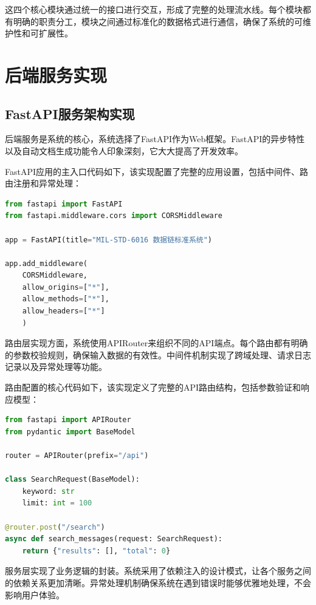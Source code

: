 这四个核心模块通过统一的接口进行交互，形成了完整的处理流水线。每个模块都有明确的职责分工，模块之间通过标准化的数据格式进行通信，确保了系统的可维护性和可扩展性。





\section{后端服务实现}

\subsection{FastAPI服务架构实现}

后端服务是系统的核心，系统选择了FastAPI作为Web框架。FastAPI的异步特性以及自动文档生成功能令人印象深刻，它大大提高了开发效率。

FastAPI应用的主入口代码如下，该实现配置了完整的应用设置，包括中间件、路由注册和异常处理：

\begin{lstlisting}[language=Python, label=fig:fastapi_main]
from fastapi import FastAPI
from fastapi.middleware.cors import CORSMiddleware

app = FastAPI(title="MIL-STD-6016 数据链标准系统")

app.add_middleware(
    CORSMiddleware,
    allow_origins=["*"],
    allow_methods=["*"],
    allow_headers=["*"]
    )
\end{lstlisting}

路由层实现方面，系统使用APIRouter来组织不同的API端点。每个路由都有明确的参数校验规则，确保输入数据的有效性。中间件机制实现了跨域处理、请求日志记录以及异常处理等功能。

路由配置的核心代码如下，该实现定义了完整的API路由结构，包括参数验证和响应模型：

\begin{lstlisting}[language=Python, label=fig:fastapi_routes]
from fastapi import APIRouter
from pydantic import BaseModel

router = APIRouter(prefix="/api")

class SearchRequest(BaseModel):
    keyword: str
    limit: int = 100

@router.post("/search")
async def search_messages(request: SearchRequest):
    return {"results": [], "total": 0}
\end{lstlisting}

服务层实现了业务逻辑的封装。系统采用了依赖注入的设计模式，让各个服务之间的依赖关系更加清晰。异常处理机制确保系统在遇到错误时能够优雅地处理，不会影响用户体验。

